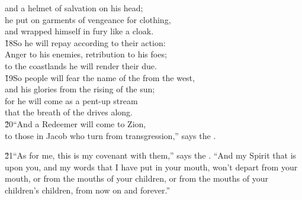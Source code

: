 \begin{poetry}
\poemll    and a helmet of salvation on his head; \\
\poeml he put on garments of vengeance for clothing, \\
\poemll    and wrapped himself in fury like a cloak. \\
\poeml \v{18}So he will repay according to their action: \\
\poemll    Anger to his enemies, retribution to his foes; \\
\poemlll       to the coastlands he will render their due. \\
\poeml \v{19}So people will fear the name of the  from the west, \\
\poemll    and his glories from the rising of the sun; \\
\poeml for he will come as a pent-up stream \\
\poemll    that the breath of the  drives along. \\
\poeml \v{20}``And a Redeemer will come to Zion, \\
\poemll    to those in Jacob who turn from transgression,'' says the .
\end{poetry}

\v{21}``As for me, this is my covenant with them,'' says the . ``And my Spirit that is upon you, and my words that I have put in your mouth, won't depart from your mouth, or from the mouths of your children, or from the mouths of your children's children, from now on and forever.''

